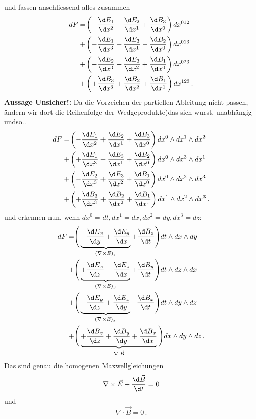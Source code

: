 und fassen anschliessend alles zusammen
\begin{align*}
	dF =
	&\left( - \frac{\d E_1}{\d x^2} + \frac{\d E_2}{\d x^1} + \frac{\d B_3}{\d x^0} \right) dx^{012}
	\\
	+&\left( - \frac{\d E_1}{\d x^3} + \frac{\d E_3}{\d x^1} - \frac{\d B_2}{\d x^0} \right) dx^{013}
	\\
	+&\left( - \frac{\d E_2}{\d x^3} + \frac{\d E_3}{\d x^2} + \frac{\d B_1}{\d x^0} \right) dx^{023}
	\\
	+&\left( + \frac{\d B_3}{\d x^3} + \frac{\d B_2}{\d x^2} + \frac{\d B_1}{\d x^1} \right) dx^{123} \, .
\end{align*}
\textbf{Aussage Unsicher!:} Da die Vorzeichen der partiellen Ableitung nicht passen, ändern wir dort die Reihenfolge der Wedgeprodukte)das sich wurst, unabhängig undso..
\begin{align*}
	dF =
	&\left( - \frac{\d E_1}{\d x^2} + \frac{\d E_2}{\d x^1} + \frac{\d B_3}{\d x^0} \right) dx^0 \wedge dx^1 \wedge dx^2
	\\
	+&\left( + \frac{\d E_1}{\d x^3} - \frac{\d E_3}{\d x^1} + \frac{\d B_2}{\d x^0} \right) dx^0 \wedge dx^3 \wedge dx^1
	\\
	+&\left( - \frac{\d E_2}{\d x^3} + \frac{\d E_3}{\d x^2} + \frac{\d B_1}{\d x^0} \right) dx^0 \wedge dx^2 \wedge dx^3
	\\
	+&\left( + \frac{\d B_3}{\d x^3} + \frac{\d B_2}{\d x^2} + \frac{\d B_1}{\d x^1} \right) dx^1 \wedge dx^2 \wedge dx^3 \, .
\end{align*}
und erkennen nun, wenn $dx^0 = dt, dx^1 = dx, dx^2 = dy, dx^3 = dz$:
\begin{align*}
	dF =
	&\Bigg( \underbrace{ - \frac{\d E_x}{\d y} + \frac{\d E_y}{\d x}}_{(\nabla \times E)_z} + \frac{\d B_z}{\d t} \Bigg) dt \wedge dx \wedge dy
	\\
	+&\Bigg( \underbrace{ + \frac{\d E_x}{\d z} - \frac{\d E_z}{\d x}}_{(\nabla \times E)_y} + \frac{\d B_y}{\d t} \Bigg) dt \wedge dz \wedge dx
	\\
	+&\Bigg( \underbrace{ - \frac{\d E_y}{\d z} + \frac{\d E_z}{\d y}}_{(\nabla \times E)_x} + \frac{\d B_x}{\d t} \Bigg) dt \wedge dy \wedge dz
	\\
	+&\Bigg( \underbrace{ + \frac{\d B_z}{\d z} + \frac{\d B_y}{\d y} + \frac{\d B_x}{\d x}}_{\nabla \cdot \vec{B}} \Bigg) dx \wedge dy \wedge dz \, .
\end{align*}
Das sind genau die homogenen Maxwellgleichungen
\[
\nabla \times \vec{E} + \frac{\d \vec{B}}{\d t} = 0
\]
und
\[
\nabla \cdot \vec{B} = 0 \, .
\]
